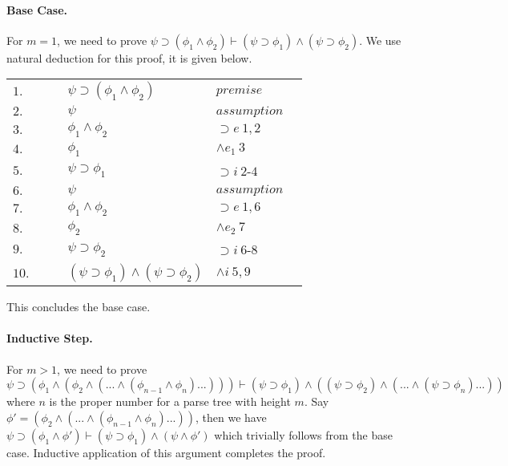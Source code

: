 \documentclass[11pt,a4paper]{article}
\begin{document}
\paragraph{Base Case.} For $m = 1$, we need to prove $\psi \supset (\phi_1 \wedge \phi_2) \vdash (\psi \supset \phi_1) \land (\psi \supset \phi_2)$. We use natural deduction for this proof, it is given below.

\begin{table}[H]
		\centering
		\begin{tabular}{*6{l}}
			$1.$ & & & $\psi \supset (\phi_1 \wedge \phi_2)$ & $premise$ & \\
			
			\cline{2-6}
			
			$2.$ &\multicolumn{1}{|c}{} & & $\psi$ & $assumption$ &\multicolumn{1}{c|}{}\\
			
			$3.$ &\multicolumn{1}{|c}{} & & $\phi_1 \land \phi_2$ & $\supset e \ 1, 2$ &\multicolumn{1}{c|}{}\\
			
			$4.$ &\multicolumn{1}{|c}{} & & $\phi_1$ & $\land e_1 \ 3$ &\multicolumn{1}{c|}{}\\ \cline{2-6}
			
			
			$5.$ & & & $\psi \supset \phi_1$ & $\supset i \ 2$-$4$ &\\ 
			
			\cline{2-6}
			
			$6.$ &\multicolumn{1}{|c}{} & & $\psi$ & $assumption$ &\multicolumn{1}{c|}{}\\
			
			$7.$ &\multicolumn{1}{|c}{} & & $\phi_1 \land \phi_2$ & $\supset e \ 1, 6$ &\multicolumn{1}{c|}{}\\
			
			$8.$ &\multicolumn{1}{|c}{} & & $\phi_2$ & $\land e_2 \ 7$ &\multicolumn{1}{c|}{}\\ \cline{2-6}
			
			$9.$ & & & $\psi \supset \phi_2$ & $\supset i \ 6$-$8$ &\\ 
			
			$10.$ & & & $(\psi \supset \phi_1) \land (\psi \supset \phi_2)$ & $\land i \ 5, 9$ &\\ 
		
		\end{tabular}
		\end{table}
\noindent
This concludes the base case.

\paragraph{Inductive Step.} For $m > 1$, we need to prove $\psi \supset (\phi_1 \wedge (\phi_2 \wedge (... \wedge(\phi_{n-1} \wedge \phi_n) ... ))) \vdash (\psi \supset \phi_1) \wedge ( (\psi \supset \phi_2) \wedge (... \wedge (\psi \supset \phi_n) ...) )$ where $n$ is the proper number for a parse tree with height $m$. Say $\phi' =(\phi_2 \wedge (... \wedge(\phi_{n-1} \wedge \phi_n) ... ))$, then we have  $\psi \supset (\phi_1 \land \phi') \vdash (\psi \supset \phi_1) \land (\psi \land \phi')$ which trivially follows from the base case. Inductive application of this argument completes the proof.
\end{document}
